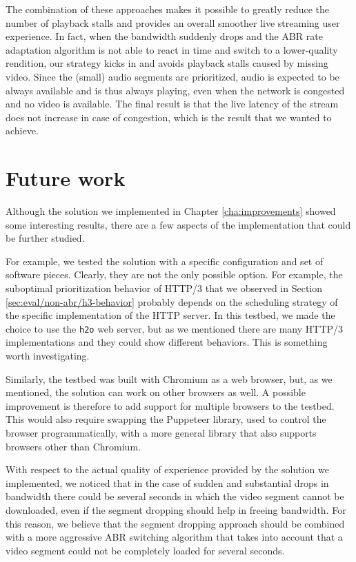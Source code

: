 The combination of these approaches makes it possible to greatly reduce the number of playback stalls and provides an overall smoother live streaming user experience. In fact, when the bandwidth suddenly drops and the ABR rate adaptation algorithm is not able to react in time and switch to a lower-quality rendition, our strategy kicks in and avoids playback stalls caused by missing video. Since the (small) audio segments are prioritized, audio is expected to be always available and is thus always playing, even when the network is congested and no video is available. The final result is that the live latency of the stream does not increase in case of congestion, which is the result that we wanted to achieve.

\section{Future work}
\label{sec:conclusions/future}

Although the solution we implemented in Chapter \ref{cha:improvements} showed some interesting results, there are a few aspects of the implementation that could be further studied.

For example, we tested the solution with a specific configuration and set of software pieces. Clearly, they are not the only possible option. For example, the suboptimal prioritization behavior of HTTP/3 that we observed in Section \ref{sec:eval/non-abr/h3-behavior} probably depends on the scheduling strategy of the specific implementation of the HTTP server. In this testbed, we made the choice to use the \texttt{h2o} web server, but as we mentioned there are many HTTP/3 implementations and they could show different behaviors. This is something worth investigating.

Similarly, the testbed was built with Chromium as a web browser, but, as we mentioned, the solution can work on other browsers as well. A possible improvement is therefore to add support for multiple browsers to the testbed. This would also require swapping the Puppeteer library, used to control the browser programmatically, with a more general library that also supports browsers other than Chromium.

With respect to the actual quality of experience provided by the solution we implemented, we noticed that in the case of sudden and substantial drops in bandwidth there could be several seconds in which the video segment cannot be downloaded, even if the segment dropping should help in freeing bandwidth. For this reason, we believe that the segment dropping approach should be combined with a more aggressive ABR switching algorithm that takes into account that a video segment could not be completely loaded for several seconds.

